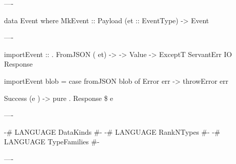----

\begin{hs}
  data Event where
    MkEvent :: Payload (et :: EventType) -> Event
\end{hs}

----

\begin{raw}
  importEvent :: 
               . FromJSON ( et)
              -> 
              -> Value
              -> ExceptT ServantErr IO Response

  importEvent \note{_} blob =
    case fromJSON blob of
      Error err ->
        throwError err

      Success (e ) ->
        pure . Response \$  e
\end{raw}

----

\begin{raw}
  {-# LANGUAGE DataKinds           #-}
  {-# LANGUAGE RankNTypes          #-}
  {-# LANGUAGE TypeFamilies        #-}
\end{raw}


----


